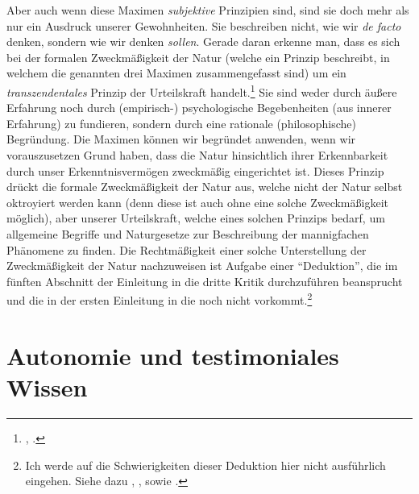 \begin{nummerierung}
Aber auch wenn diese Maximen
\emph{subjektive} Prinzipien sind, sind sie doch mehr als nur ein Ausdruck
unserer Gewohnheiten. Sie beschreiben nicht, wie wir \emph{de facto} denken,
sondern wie wir denken \emph{sollen}. Gerade daran erkenne man, dass es sich bei
der formalen Zweckmäßigkeit der Natur (welche ein Prinzip beschreibt, in welchem
die genannten drei Maximen zusammengefasst sind) um ein \emph{transzendentales}
Prinzip der Urteilskraft handelt.\footnote{\cite[Vgl.][B
xxxi]{Kant:KritikderUrteilskraft2009}, \cite[][V:
182.26--36]{Kant:GesammelteWerke1900ff.}.} Sie sind weder durch äußere Erfahrung
noch durch (empirisch-) psychologische Begebenheiten (aus innerer Erfahrung) zu
fundieren, sondern durch eine rationale (philosophische) Begründung. Die Maximen
können wir begründet anwenden, wenn wir vorauszusetzen Grund haben, dass die
Natur hinsichtlich ihrer Erkennbarkeit durch unser Erkenntnisvermögen zweckmäßig
eingerichtet ist. Dieses Prinzip drückt die formale Zweckmäßigkeit der Natur aus, welche nicht der
Natur selbst oktroyiert werden kann (denn diese ist auch ohne eine solche
Zweckmäßigkeit möglich), aber unserer Urteilskraft, welche eines solchen
Prinzips bedarf, um allgemeine Begriffe und Naturgesetze zur Beschreibung der
mannigfachen Phänomene zu finden. Die Rechtmäßigkeit einer solche
Unterstellung der Zweckmäßigkeit der Natur nachzuweisen ist Aufgabe einer
\enquote{Deduktion}, die  im fünften Abschnitt der
Einleitung in die dritte Kritik durchzuführen beansprucht und die in der ersten
Einleitung in die  noch nicht
vorkommt.\footnote{Ich werde auf die Schwierigkeiten dieser Deduktion hier nicht
ausführlich eingehen. Siehe dazu
\cite[][35--42]{Allison:KantsTheoryofTaste2001},
\cite{Allison:ReflectiveJudgmentandtheApplicationofLogictoNature2012}, sowie
\cite{Guyer:ReasonandReflectiveJudgment1990}.}
\end{nummerierung}

\section{Autonomie und testimoniales
Wissen}\label{section:AutonomieundtestimonialesWissen}

